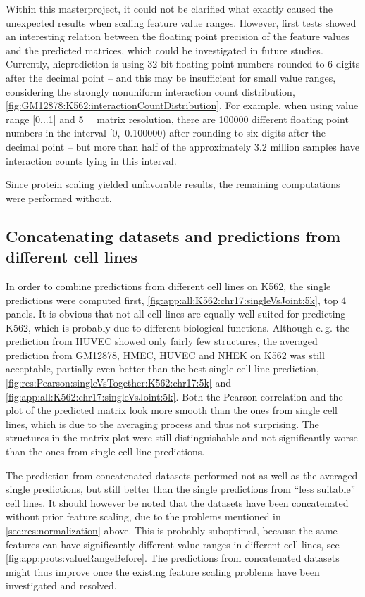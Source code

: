 Within this masterproject, it could not be clarified what exactly caused the
unexpected results when scaling feature value ranges.
However, first tests showed an interesting relation between the
floating point precision of the feature values and the predicted matrices,
which could be investigated in future studies.
Currently, hicprediction is using 32-bit floating point numbers rounded
to 6 digits after the decimal point -- and this may be insufficient
for small value ranges, considering the strongly nonuniform interaction count distribution, 
\autoref{fig:GM12878:K562:interactionCountDistribution}.
For example, when using value range [0...1] and \SI{5}{\kilo\bp} matrix resolution, 
there are \num{100000} different floating point numbers in the 
interval [0,~0.100000) after rounding to six digits after the decimal point -- but more than half of the approximately 3.2 million samples have interaction 
counts lying in this interval.

Since protein scaling yielded unfavorable results,
the remaining computations were performed without.

\subsection{Concatenating datasets and predictions from different cell lines}\label{sec:res:concat}
In order to combine predictions from different cell lines on K562, 
the single predictions were computed first, \autoref{fig:app:all:K562:chr17:singleVsJoint:5k},
top 4 panels.
It is obvious that not all cell lines  are equally well suited for predicting K562,
which is probably due to different biological functions.
Although e.\,g. the prediction from HUVEC showed only fairly few structures,
the averaged prediction from GM12878, HMEC, HUVEC and NHEK on K562 was still acceptable,
partially even better than the best single-cell-line prediction, 
\autoref{fig:res:Pearson:singleVsTogether:K562:chr17:5k} and 
\ref{fig:app:all:K562:chr17:singleVsJoint:5k}. 
Both the Pearson correlation and the plot of the predicted matrix look more smooth than the ones
from single cell lines, which is due to the averaging process and thus not surprising.
The structures in the matrix plot were still distinguishable and not significantly worse
than the ones from single-cell-line predictions.

The prediction from concatenated datasets performed not as well as the averaged single predictions,
but still better than the single predictions from ``less suitable'' cell lines. 
It should however be noted that the datasets have been concatenated without prior feature scaling, due 
to the problems mentioned in \autoref{sec:res:normalization} above.
This is probably suboptimal, because the same features can have significantly different value ranges in different cell lines,
see \autoref{fig:app:prots:valueRangeBefore}.
The predictions from concatenated datasets might thus improve once the 
existing feature scaling problems have been investigated and resolved.


